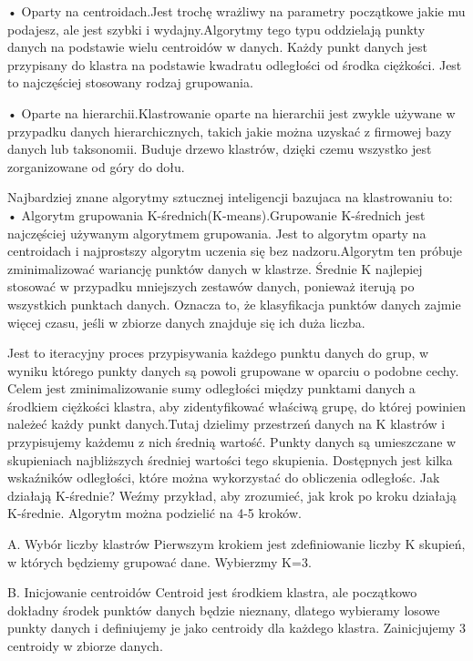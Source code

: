   •  Oparty na centroidach.Jest trochę wrażliwy na parametry początkowe jakie mu podajesz, ale jest szybki i wydajny.Algorytmy tego typu oddzielają punkty danych na podstawie wielu centroidów w danych. Każdy punkt danych jest przypisany do klastra na podstawie kwadratu odległości od środka ciężkości. Jest to najczęściej stosowany rodzaj grupowania.
  
  •  Oparte na hierarchii.Klastrowanie oparte na hierarchii jest zwykle używane w przypadku danych hierarchicznych, takich jakie można uzyskać z firmowej bazy danych lub taksonomii. Buduje drzewo klastrów, dzięki czemu wszystko jest zorganizowane od góry do dołu.\cite{clust2020}

Najbardziej znane algorytmy sztucznej inteligencji bazujaca na klastrowaniu to:
  • Algorytm grupowania K-średnich(K-means).Grupowanie K-średnich jest najczęściej używanym algorytmem grupowania. Jest to algorytm oparty na centroidach i najprostszy algorytm uczenia się bez nadzoru.Algorytm ten próbuje zminimalizować wariancję punktów danych w klastrze. Średnie K najlepiej stosować w przypadku mniejszych zestawów danych, ponieważ iterują po wszystkich punktach danych. Oznacza to, że klasyfikacja punktów danych zajmie więcej czasu, jeśli w zbiorze danych znajduje się ich duża liczba.\cite{clust2020}

Jest to iteracyjny proces przypisywania każdego punktu danych do grup, w wyniku którego punkty danych są powoli grupowane w oparciu o podobne cechy. Celem jest zminimalizowanie sumy odległości między punktami danych a środkiem ciężkości klastra, aby zidentyfikować właściwą grupę, do której powinien należeć każdy punkt danych.Tutaj dzielimy przestrzeń danych na K klastrów i przypisujemy każdemu z nich średnią wartość. Punkty danych są umieszczane w skupieniach najbliższych średniej wartości tego skupienia. Dostępnych jest kilka wskaźników odległości, które można wykorzystać do obliczenia odległośc.
Jak działają K-średnie?
Weźmy przykład, aby zrozumieć, jak krok po kroku działają K-średnie. Algorytm można podzielić na 4-5 kroków.


    A. Wybór liczby klastrów
Pierwszym krokiem jest zdefiniowanie liczby K skupień, w których będziemy grupować dane. Wybierzmy K=3.

    B. Inicjowanie centroidów
Centroid jest środkiem klastra, ale początkowo dokładny środek punktów danych będzie nieznany, dlatego wybieramy losowe punkty danych i definiujemy je jako centroidy dla każdego klastra. Zainicjujemy 3 centroidy w zbiorze danych.


